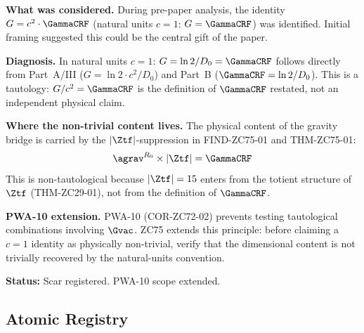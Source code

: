 \documentclass[12pt, a4paper]{article}
\begin{document}
\begin{derivedbox}[title={PM-ZC75-01: $G = c^2 \cdot \GammaCRF$
  Is Tautological in Natural Units (Failure Stance)}]

\textbf{What was considered.}
During pre-paper analysis, the identity $G = c^2 \cdot \GammaCRF$
(natural units $c=1$: $G = \GammaCRF$) was identified.
Initial framing suggested this could be the central gift of the paper.

\textbf{Diagnosis.}
In natural units $c = 1$: $G = \ln2/D_0 = \GammaCRF$ follows
directly from Part~A/III ($G = \ln2 \cdot c^2/D_0$) and Part~B
($\GammaCRF = \ln2/D_0$).
This is a tautology: $G/c^2 = \GammaCRF$ is the definition of
$\GammaCRF$ restated, not an independent physical claim.

\textbf{Where the non-trivial content lives.}
The physical content of the gravity bridge is carried by the
$|\Ztf|$-suppression in FIND-ZC75-01 and THM-ZC75-01:
\[
  \agrav^{R_0} \times |\Ztf| = \GammaCRF
\]
This is non-tautological because $|\Ztf| = 15$ enters from the
totient structure of $\Ztf$ (THM-ZC29-01), not from the definition
of $\GammaCRF$.

\textbf{PWA-10 extension.}
PWA-10 (COR-ZC72-02) prevents testing tautological combinations
involving $\Gvac$.
ZC75 extends this principle: before claiming a $c=1$ identity
as physically non-trivial, verify that the dimensional content
is not trivially recovered by the natural-units convention.

\textbf{Status:} Scar registered. PWA-10 scope extended.
\end{derivedbox}

\subsection{Atomic Registry}
\label{sec:registry}
\end{document}
